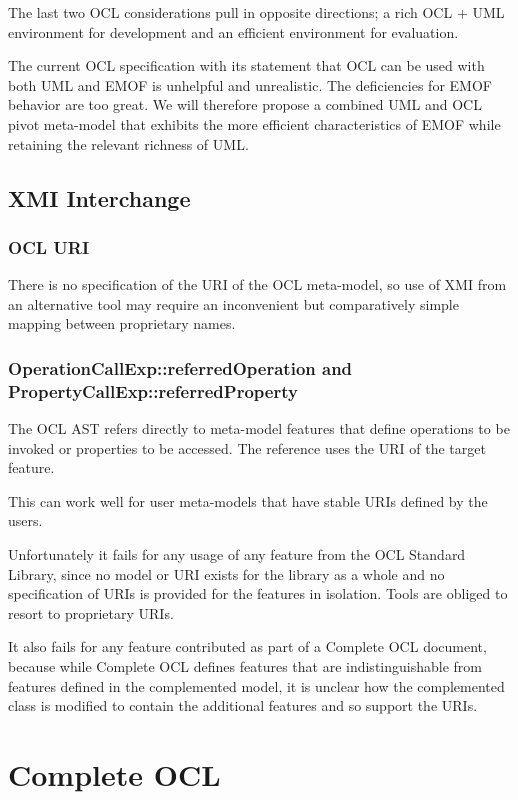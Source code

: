\documentclass{eceasst}
\begin{document}
The last two OCL considerations pull in opposite directions; a rich OCL + UML environment for development and an efficient environment for evaluation.

The current OCL specification with its statement that OCL can be used with both UML and EMOF is unhelpful and unrealistic. The deficiencies for EMOF behavior are too great. We will therefore propose a combined UML and OCL pivot meta-model that exhibits the more efficient characteristics of EMOF while retaining the relevant richness of UML.

\subsection{XMI Interchange}
 
\subsubsection{OCL URI}

There is no specification of the URI of the OCL meta-model, so use of XMI from an alternative tool may require an inconvenient but comparatively simple mapping between proprietary names.

\subsubsection{OperationCallExp::referredOperation and PropertyCallExp::referredProperty}

The OCL AST refers directly to meta-model features that define operations to be invoked or properties to be accessed. The reference uses the URI of the target feature.

This can work well for user meta-models that have stable URIs defined by the users.

Unfortunately it fails for any usage of any feature from the OCL Standard Library, since no model or URI exists for the library as a whole and no specification of URIs is provided for the features in isolation. Tools are obliged to resort to proprietary URIs.

It also fails for any feature contributed as part of a Complete OCL document, because while Complete OCL defines features that are indistinguishable from features defined in the complemented model, it is unclear how the complemented class is modified to contain the additional features and so support the URIs.

\section{Complete OCL}
\end{document}
